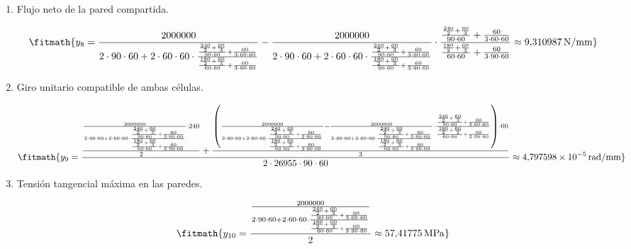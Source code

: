 \begin{enumerate}
\item Flujo neto de la pared compartida.

\[\fitmath{y_{8}=\frac{2000000}{2\cdot 90\cdot 60+2\cdot 60\cdot 60\cdot \frac{\frac{\frac{240}{2}+\frac{60}{3}}{90\cdot 60}+\frac{60}{3\cdot 60\cdot 60}}{\frac{\frac{180}{2}+\frac{60}{3}}{60\cdot 60}+\frac{60}{3\cdot 90\cdot 60}}}-\frac{2000000}{2\cdot 90\cdot 60+2\cdot 60\cdot 60\cdot \frac{\frac{\frac{240}{2}+\frac{60}{3}}{90\cdot 60}+\frac{60}{3\cdot 60\cdot 60}}{\frac{\frac{180}{2}+\frac{60}{3}}{60\cdot 60}+\frac{60}{3\cdot 90\cdot 60}}}\cdot \frac{\frac{\frac{240}{2}+\frac{60}{3}}{90\cdot 60}+\frac{60}{3\cdot 60\cdot 60}}{\frac{\frac{180}{2}+\frac{60}{3}}{60\cdot 60}+\frac{60}{3\cdot 90\cdot 60}}\approx 9{,}310987\,\mathrm{N/mm}}\]

\item Giro unitario compatible de ambas células.

\[\fitmath{y_{9}=\frac{\frac{\frac{2000000}{2\cdot 90\cdot 60+2\cdot 60\cdot 60\cdot \frac{\frac{\frac{240}{2}+\frac{60}{3}}{90\cdot 60}+\frac{60}{3\cdot 60\cdot 60}}{\frac{\frac{180}{2}+\frac{60}{3}}{60\cdot 60}+\frac{60}{3\cdot 90\cdot 60}}}\cdot 240}{2}+\frac{\left(\frac{2000000}{2\cdot 90\cdot 60+2\cdot 60\cdot 60\cdot \frac{\frac{\frac{240}{2}+\frac{60}{3}}{90\cdot 60}+\frac{60}{3\cdot 60\cdot 60}}{\frac{\frac{180}{2}+\frac{60}{3}}{60\cdot 60}+\frac{60}{3\cdot 90\cdot 60}}}-\frac{2000000}{2\cdot 90\cdot 60+2\cdot 60\cdot 60\cdot \frac{\frac{\frac{240}{2}+\frac{60}{3}}{90\cdot 60}+\frac{60}{3\cdot 60\cdot 60}}{\frac{\frac{180}{2}+\frac{60}{3}}{60\cdot 60}+\frac{60}{3\cdot 90\cdot 60}}}\cdot \frac{\frac{\frac{240}{2}+\frac{60}{3}}{90\cdot 60}+\frac{60}{3\cdot 60\cdot 60}}{\frac{\frac{180}{2}+\frac{60}{3}}{60\cdot 60}+\frac{60}{3\cdot 90\cdot 60}}\right)\cdot 60}{3}}{2\cdot 26955\cdot 90\cdot 60}\approx 4{,}797598\times10^{-5}\,\mathrm{rad/mm}}\]

\item Tensión tangencial máxima en las paredes.

\[\fitmath{y_{10}=\frac{\frac{2000000}{2\cdot 90\cdot 60+2\cdot 60\cdot 60\cdot \frac{\frac{\frac{240}{2}+\frac{60}{3}}{90\cdot 60}+\frac{60}{3\cdot 60\cdot 60}}{\frac{\frac{180}{2}+\frac{60}{3}}{60\cdot 60}+\frac{60}{3\cdot 90\cdot 60}}}}{2}\approx 57{,}41775\,\mathrm{MPa}}\]

\end{enumerate}
